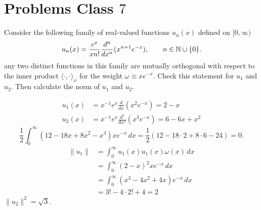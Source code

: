 \documentclass[10pt, a4paper]{article}
\begin{document}
\newpage

\section{Problems Class \texorpdfstring{$7$}{}}

\begin{problem}\phantom{}
    Consider the following family of real-valued functions $u_n(x)$ defined on $[0, \infty)$
    \[
    u_n(x) = \frac{e ^ x}{xn!}\frac{d ^ n}{dx ^ n}(x ^ {n + 1}e ^ {-x}),\qquad n \in \mathbb{N} \cup \{0\}.
    \]
    any two distinct functions in this family are mutually orthogonal with respect to the inner product $\langle\cdot, \cdot\rangle_{\omega}$ for the weight $\omega \equiv xe ^ {-x}$.
    Check this statement for $u_1$ and $u_2$.
    Then calculate the norm of $u_1$ and $u_2$.

    \begin{solution}
        \begin{align*}
            u_1(x) &= x ^ {-1}e ^ x\frac{d}{dx}(x ^ 2e ^ {-x}) = 2 - x \\
            u_2(x) &= x ^ {-1}e ^ x\frac{d ^ 2}{dx ^ 2}(x ^ 3e ^ {-x}) = 6 - 6x + x ^ 2
        \end{align*}
        \[
        \frac{1}{2}\int_{0}^{\infty}(12 - 18x + 8x ^ 2 - x ^ 3)xe ^ {-x}\,dx = \frac{1}{2}(12 - 18 \cdot 2 + 8 \cdot 6 - 24) = 0.
        \]
        \begin{align*}
            \|u_1\| &= \int_{0}^{\infty}u_1(x)u_1(x)\omega(x)\,dx \\
            &= \int_{0}^{\infty}(2 - x) ^ 2xe ^ {-x}\,dx \\
            &= \int_{0}^{\infty}(x ^ 3 - 4x ^ 2 + 4x)e ^ {-x}\,dx \\
            &= 3! - 4\cdot2! + 4 = 2
        \end{align*}
        $\|u_2\| ^ 2 = \sqrt{3}$.
    \end{solution}
\end{problem}
\end{document}
